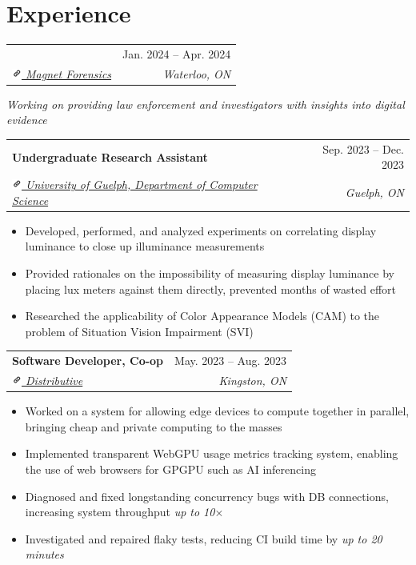 \documentclass[letterpaper, 10pt]{report}
\makeatletter
\newcommand{\resumeSubheading}[4]{
    \begin{tabular*}{\textwidth}[t]{l@{\extracolsep{\fill}}r}
        \textbf{#1}       & #2                \\
        \textit{\small#3} & \textit{\small#4} \\
    \end{tabular*}\vspace{-0.7em}
}
\newenvironment{ResumeItem}{
    \vspace{-0.3em}
    \begin{itemize}
        \setlength\itemsep{-0.3em}
        }{
    \end{itemize}\vspace{-0.3em}}
\newcommand{\linkIcon}{\includegraphics[height=9pt, trim=0 5cm 0 -1.5cm]{link-icon}}
\makeatother
\begin{document}
    \section{Experience}
    \resumeSubheading
    {\color{Black}{Software Developer, Co-op}}{Jan. 2024 -- Apr. 2024}
    {\href{https://www.magnetforensics.com/}{\linkIcon{} Magnet Forensics}}{Waterloo, ON}
    \begin{center}
    \itshape{Working on providing law enforcement and investigators with insights into digital evidence}
    \end{center}
    \resumeSubheading
    {Undergraduate Research Assistant}{Sep. 2023 -- Dec. 2023}
    {\href{https://www.uoguelph.ca/computing}{\linkIcon{} University of Guelph, Department of Computer Science}}{Guelph, ON}
    \begin{ResumeItem}
        \item{Developed, performed, and analyzed experiments on correlating display luminance to close up illuminance measurements}
        \item{Provided rationales on the impossibility of measuring display luminance by placing lux meters against them directly, prevented months of wasted effort}
        \item{Researched the applicability of Color Appearance Models (CAM) to the problem of Situation Vision Impairment (SVI)}
    \end{ResumeItem}

    \resumeSubheading
    {Software Developer, Co-op}{May. 2023 -- Aug. 2023}
    {\href{https://kingsds.network/}{\linkIcon{} Distributive}}{Kingston, ON}
    \begin{ResumeItem}
        \item{Worked on a system for allowing edge devices to compute together in parallel, bringing cheap and private computing to the masses}
        \item{Implemented transparent WebGPU usage metrics tracking system, enabling the use of web browsers for GPGPU such as AI inferencing}
        \item{Diagnosed and fixed longstanding concurrency bugs with DB connections, increasing system throughput \emph{up to 10\(\times\)}}
        \item{Investigated and repaired flaky tests, reducing CI build time by \emph{up to 20 minutes}}
    \end{ResumeItem}
\end{document}
